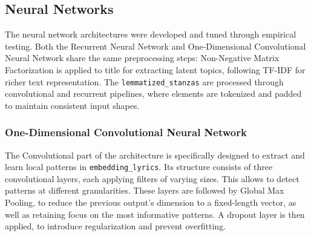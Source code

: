 \subsection*{Neural Networks}

The neural network architectures were developed and tuned through empirical
testing. Both the Recurrent
Neural Network and One-Dimensional Convolutional Neural Network share the same
preprocessing steps: Non-Negative Matrix Factorization is applied to title
for extracting latent topics, following TF-IDF for richer text representation.
The \texttt{lemmatized\_stanzas} are processed through convolutional and
recurrent pipelines, where elements are tokenized and padded to maintain
consistent input shapes.

\subsubsection*{One-Dimensional Convolutional Neural Network}
The Convolutional part of the architecture is specifically designed to extract and learn
local patterns in \texttt{embedding\_lyrics}.
Its structure consists of three convolutional layers, each applying filters of
varying sizes. This allows to detect patterns at different granularities.
These layers are followed by Global Max Pooling, to reduce the previous output's
dimension to a fixed-length vector, as well as retaining focus on the most
informative patterns.
A dropout layer is then applied, to introduce regularization and prevent
overfitting.

